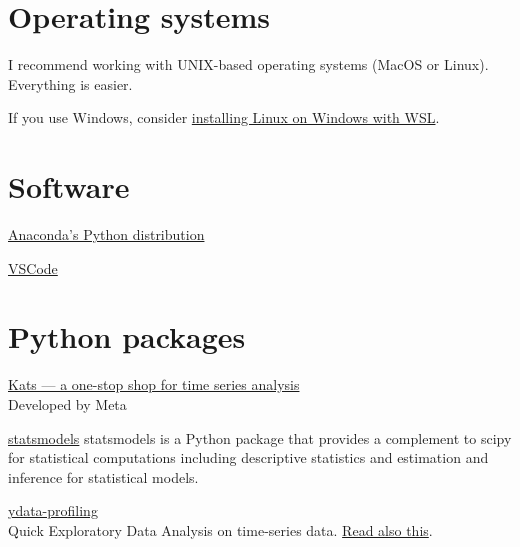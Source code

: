 \documentclass[
  letterpaper,
  DIV=11,
  numbers=noendperiod,
  oneside]{scrreprt}
\begin{document}
\hypertarget{operating-systems}{%
\section*{Operating systems}\label{operating-systems}}


I recommend working with UNIX-based operating systems (MacOS or Linux).
Everything is easier.

If you use Windows, consider
\href{https://learn.microsoft.com/en-us/windows/wsl/install}{installing
Linux on Windows with WSL}.

\hypertarget{software}{%
\section*{Software}\label{software}}


\href{https://www.anaconda.com/download}{Anaconda's Python distribution}

\href{https://code.visualstudio.com/download}{VSCode}

\hypertarget{python-packages}{%
\section*{Python packages}\label{python-packages}}


\href{https://engineering.fb.com/2021/06/21/open-source/kats/}{Kats ---
a one-stop shop for time series analysis}\\
Developed by Meta

\href{https://www.statsmodels.org/stable/}{statsmodels} statsmodels is a
Python package that provides a complement to scipy for statistical
computations including descriptive statistics and estimation and
inference for statistical models.

\href{https://ydata-profiling.ydata.ai/docs/master/pages/use_cases/time_series_datasets.html}{ydata-profiling}\\
Quick Exploratory Data Analysis on time-series data.
\href{https://towardsdatascience.com/how-to-do-an-eda-for-time-series-cbb92b3b1913}{Read
also this}.

\end{document}
